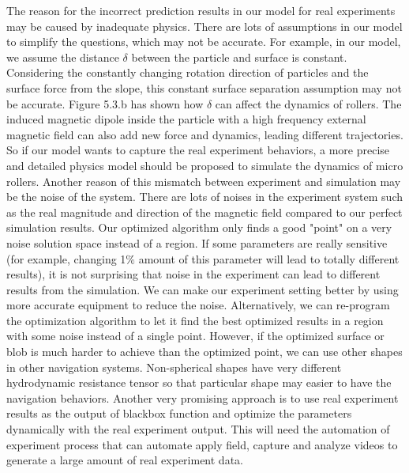  The reason for the incorrect prediction results in our model for real experiments may be caused by inadequate physics. There are lots of assumptions in our model to simplify the questions, which may not be accurate. For example, in our model,  we assume the distance $\delta$ between the particle and surface is constant. Considering the constantly changing rotation direction of particles and the surface force from the slope, this constant surface separation assumption may not be accurate. Figure 5.3.b has shown how $\delta$ can affect the dynamics of rollers. The induced magnetic dipole inside the particle with a high frequency external magnetic field can also add new force and dynamics, leading different trajectories.
 So if our model wants to capture the real experiment behaviors, a more precise and detailed physics model should be proposed to  simulate the dynamics of micro rollers. Another reason of this mismatch between experiment and simulation may be the noise of the system. There are lots of noises in the experiment system  such as the real magnitude and direction of the magnetic field compared to our perfect simulation results. Our optimized algorithm only finds a good  "point" on a very noise solution space instead of a region. If some parameters are really sensitive (for example, changing 1$\%$ amount of this parameter will lead to totally different results), it is not surprising that noise in the experiment can lead to different results from the simulation. We can make our experiment setting better by using more accurate equipment to reduce the noise. Alternatively, we can re-program the optimization algorithm to let it find the best optimized results in a region with some noise instead of a single point. However, if the optimized  surface or blob is much harder to achieve than the optimized point, we can use other shapes in other navigation systems. Non-spherical shapes have very different hydrodynamic resistance tensor\autocite{brooks2018shape} so that particular shape may easier to have the navigation behaviors. Another very promising approach is to use real experiment results as the output of blackbox function and optimize the parameters dynamically with the real experiment output. This will need the automation of experiment process that can automate apply field, capture and analyze  videos to generate a large amount of real experiment data.\autocite{oulmas20183d}

